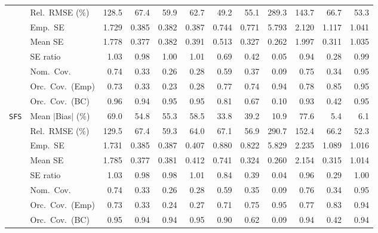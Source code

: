 \begin{landscape}
\begin{longtable}{llrrrrrrrrrr}
 & Rel.\ RMSE (\%) & 128.5 & 67.4 & 59.9 & 62.7 & \cellcolor{rankone}49.2 & \cellcolor{rankthree}55.1 & 289.3 & 143.7 & 66.7 & \cellcolor{ranktwo}53.3 \\
 & Emp.\ SE & 1.729 & 0.385 & 0.382 & 0.387 & 0.744 & 0.771 & 5.793 & 2.120 & 1.117 & 1.041 \\
 & Mean SE & 1.778 & 0.377 & 0.382 & 0.391 & 0.513 & 0.327 & 0.262 & 1.997 & 0.311 & 1.035 \\
 & SE ratio & 1.03 & \cellcolor{rankthree}0.98 & \cellcolor{rankone}1.00 & \cellcolor{ranktwo}1.01 & 0.69 & 0.42 & 0.05 & 0.94 & 0.28 & \cellcolor{ranktwo}0.99 \\
 & Nom.\ Cov. & \cellcolor{rankthree}0.74 & 0.33 & 0.26 & 0.28 & 0.59 & 0.37 & 0.09 & \cellcolor{ranktwo}0.75 & 0.34 & \cellcolor{rankone}0.95 \\
 & Orc.\ Cov.\ (Emp) & 0.73 & 0.33 & 0.23 & 0.28 & 0.77 & 0.74 & \cellcolor{ranktwo}0.94 & 0.78 & \cellcolor{rankthree}0.85 & \cellcolor{rankone}0.95 \\
 & Orc.\ Cov.\ (BC) & \cellcolor{ranktwo}0.96 & \cellcolor{ranktwo}0.94 & \cellcolor{rankone}0.95 & \cellcolor{rankone}0.95 & 0.81 & 0.67 & 0.10 & \cellcolor{rankthree}0.93 & 0.42 & \cellcolor{rankone}0.95 \\
\addlinespace[2pt]
\quad \texttt{SFS} & Mean $|$Bias$|$ (\%) & 69.0 & 54.8 & 55.3 & 58.5 & 33.8 & 39.2 & \cellcolor{rankthree}10.9 & 77.6 & \cellcolor{rankone}5.4 & \cellcolor{ranktwo}6.1 \\
 & Rel.\ RMSE (\%) & 129.5 & 67.4 & \cellcolor{rankthree}59.3 & 64.0 & 67.1 & \cellcolor{ranktwo}56.9 & 290.7 & 152.4 & 66.2 & \cellcolor{rankone}52.3 \\
 & Emp.\ SE & 1.731 & 0.385 & 0.387 & 0.407 & 0.880 & 0.822 & 5.829 & 2.235 & 1.089 & 1.016 \\
 & Mean SE & 1.785 & 0.377 & 0.381 & 0.412 & 0.741 & 0.324 & 0.260 & 2.154 & 0.315 & 1.014 \\
 & SE ratio & 1.03 & \cellcolor{rankthree}0.98 & \cellcolor{rankthree}0.98 & \cellcolor{ranktwo}1.01 & 0.84 & 0.39 & 0.04 & 0.96 & 0.29 & \cellcolor{rankone}1.00 \\
 & Nom.\ Cov. & \cellcolor{rankthree}0.74 & 0.33 & 0.26 & 0.28 & 0.59 & 0.35 & 0.09 & \cellcolor{ranktwo}0.76 & 0.34 & \cellcolor{rankone}0.95 \\
 & Orc.\ Cov.\ (Emp) & 0.73 & 0.33 & 0.24 & 0.27 & 0.71 & 0.75 & \cellcolor{rankone}0.95 & 0.77 & \cellcolor{rankthree}0.83 & \cellcolor{ranktwo}0.94 \\
 & Orc.\ Cov.\ (BC) & \cellcolor{rankone}0.95 & \cellcolor{ranktwo}0.94 & \cellcolor{ranktwo}0.94 & \cellcolor{rankone}0.95 & \cellcolor{rankthree}0.90 & 0.62 & 0.09 & \cellcolor{ranktwo}0.94 & 0.42 & \cellcolor{ranktwo}0.94 \\

\end{longtable}
\end{landscape}
